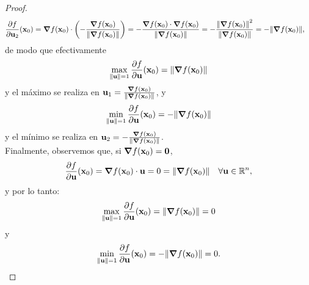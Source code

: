 \begin{theorem}
\begin{proof}
\begin{align*}
%  
 \frac{\partial f}{\partial {\mathbf{u}}_2} (\mathbf{x}_0) &= \grad f (\mathbf{x}_0) \cdot \left( - \frac{\grad f(\mathbf{x}_0)}{\norm{\grad f(\mathbf{x}_0)}} \right) = -\frac{ \grad f (\mathbf{x}_0) \cdot \grad f(\mathbf{x}_0) }{\norm{\grad f(\mathbf{x}_0)}} = -\frac{\norm{\grad f (\mathbf{x}_0)}^2 }{\norm{\grad f(\mathbf{x}_0)}} = -\norm{\grad f (\mathbf{x}_0)},
\end{align*}
de modo que efectivamente
\[
 \max_{\norm{{\mathbf{u}}}=1} \frac{\partial f}{\partial {\mathbf{u}}} (\mathbf{x}_0) = \norm{\grad f (\mathbf{x}_0)}
\]
y el m\'aximo se realiza en ${\mathbf{u}}_1 = \frac{\grad f(\mathbf{x}_0)}{\norm{\grad f(\mathbf{x}_0)}}$,
y
\[
 \min_{\norm{{\mathbf{u}}}=1} \frac{\partial f}{\partial {\mathbf{u}}} (\mathbf{x}_0) = -\norm{\grad f (\mathbf{x}_0)}
\]
y el m\'inimo se realiza en ${\mathbf{u}}_2 = -\frac{\grad f(\mathbf{x}_0)}{\norm{\grad f(\mathbf{x}_0)}}$. \\

Finalmente, observemos que, si $\grad f(\mathbf{x}_0) = \mathbf{0}$, 
\[
 \frac{\partial f}{\partial {\mathbf{u}}} (\mathbf{x}_0) = \grad f (\mathbf{x}_0) \cdot {\mathbf{u}} = 0 = \norm{\grad f(\mathbf{x}_0)} \quad \forall {\mathbf{u}} \in \mathbb{R}^n,
\]
y por lo tanto:
\[
 \max_{\norm{{\mathbf{u}}}=1} \frac{\partial f}{\partial {\mathbf{u}}} (\mathbf{x}_0) = \norm{\grad f(\mathbf{x}_0)} = 0
\]
y
\[
 \min_{\norm{{\mathbf{u}}}=1} \frac{\partial f}{\partial {\mathbf{u}}} (\mathbf{x}_0) = -\norm{\grad f(\mathbf{x}_0)} = 0.
\]
\end{proof}
\end{theorem}




